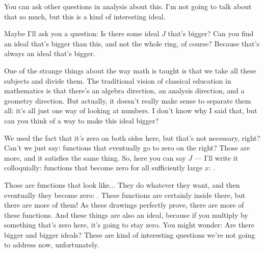 \begin{speech}[01:01:30 - 01:03:45]
You can ask other questions in analysis about this. I'm not going to talk about that so much, but this is a kind of interesting ideal.

Maybe I'll ask you a question: Is there some ideal $J$ that's bigger?  Can you find an ideal that's bigger than this, and not the whole ring, of course? Because that's always an ideal that's bigger.

One of the strange things about the way math is taught is that we take all these subjects and divide them. The traditional vision of classical education in mathematics is that there's an algebra direction, an analysis direction, and a geometry direction. But actually, it doesn't really make sense to separate them all: it's all just one way of looking at numbers. I don't know why I said that, but can you think of a way to make this ideal bigger?

We used the fact that it's zero on both sides here, but that's not necessary, right? Can't we just say: functions that eventually go to zero on the right? Those are more, and it satisfies the same thing. So, here you can say $J$ --- I'll write it colloquially: functions that become zero for all sufficiently large $x$: .

Those are functions that look like... They do whatever they want, and then eventually they become zero: . These functions are certainly inside there, but there are more of them! As these drawings perfectly prove, there are more of these functions. And these things are also an ideal, because if you multiply by something that's zero here, it's going to stay zero. You might wonder: Are there bigger and bigger ideals? These are kind of interesting questions we're not going to address now, unfortunately.
\end{speech}

